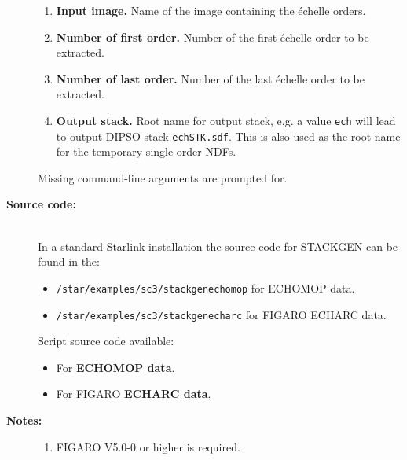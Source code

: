 \documentclass[twoside,11pt]{article}
\newcommand{\htmlref}[2]{#1}
\newenvironment{latexonly}{}{}
\newcommand{\xref}[3]{#1}
\renewcommand{\_}{\texttt{\symbol{95}}}
\begin{document}
\begin{description}
\begin{enumerate}
\item {\bf Input image.}
      Name of the image containing the \'{e}chelle orders.

\item {\bf Number of first order.}
      Number of the first \'{e}chelle order to be extracted.

\item {\bf Number of last order.}
      Number of the last \'{e}chelle order to be extracted.

\item {\bf Output stack.}
      Root name for output stack, e.g. a value \verb+ech+ will
      lead to output DIPSO stack {\tt ech\_STK.sdf}.  This is also used
      as the root name for the temporary single-order NDFs.

\end{enumerate}

     Missing command-line arguments are prompted for.

\item [{\bf Source code:}] \mbox{} \\
\begin{latexonly}
In a standard Starlink installation the source code for STACKGEN can be found
in the:
\begin{itemize}

\item {\tt /star/examples/sc3/stackgen\_echomop} for ECHOMOP data.

\item {\tt /star/examples/sc3/stackgen\_echarc} for FIGARO ECHARC data.

\end{itemize}
\end{latexonly}
\begin{htmlonly}
      Script source code available:
\begin{itemize}

\item For \htmlref{{\bf ECHOMOP data}}{se_stackgen_echomop_source}.

\item For FIGARO \htmlref{{\bf ECHARC data}}{se_stackgen_echarc_source}.

\end{itemize}
\end{htmlonly}

\item [{\bf Notes:}] \mbox{}
\begin{enumerate}

\item \xref{FIGARO}{sun86}{} V5.0-0 or higher is required.


\end{enumerate}
\end{description}
\end{document}
